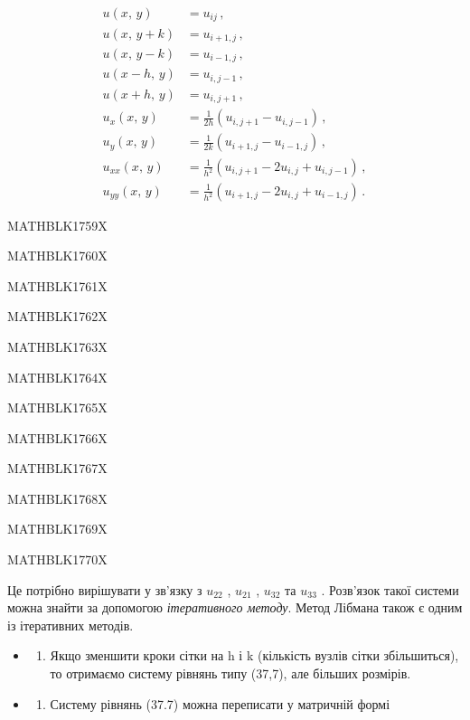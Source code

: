 \documentclass[
  ukrainian,
]{article}
\providecommand{\tightlist}{%
  \setlength{\itemsep}{0pt}\setlength{\parskip}{0pt}}
\begin{document}
\[
\begin{split} u\left(x,\,y\right) &= u_{ij}\,,\\ u\left(x,\,y+k\right) &= u_{i+1,j}\,,\\ u\left(x,\,y-k\right) &= u_{i-1,j}\,,\\ u\left(x-h,\,y\right) &= u_{i,j-1}\,,\\ u\left(x+h,\,y\right) &= u_{i,j+1}\,,\\ u_{x}\left(x,\,y\right) &= \frac{1}{2h}\left(u_{i,j+1}-u_{i,j-1}\right)\,,\\ u_{y}\left(x,\,y\right) &= \frac{1}{2k}\left(u_{i+1,j}-u_{i-1,j}\right)\,,\\ u_{xx}\left(x,\,y\right) &= \frac{1}{h^{2}}\left(u_{i,j+1}-2u_{i,j}+u_{i,j-1}\right)\,,\\ u_{yy}\left(x,\,y\right) &= \frac{1}{h^{2}}\left(u_{i+1,j}-2u_{i,j}+u_{i-1,j}\right)\,. \end{split}
\]

MATHBLK1759X

MATHBLK1760X

MATHBLK1761X

MATHBLK1762X

MATHBLK1763X

MATHBLK1764X

MATHBLK1765X

MATHBLK1766X

MATHBLK1767X

MATHBLK1768X

MATHBLK1769X

MATHBLK1770X

Це потрібно вирішувати у зв'язку з \(u_{22}\) , \(u_{21}\) , \(u_{32}\)
та \(u_{33}\) . Розв'язок такої системи можна знайти за допомогою
\emph{ітеративного методу}. Метод Лібмана також є одним із ітеративних
методів.

\begin{itemize}
\tightlist
\item
  \begin{enumerate}
  \def\labelenumi{\arabic{enumi}.}
  \setcounter{enumi}{1}
  \tightlist
  \item
    Якщо зменшити кроки сітки на h і k (кількість вузлів сітки
    збільшиться), то отримаємо систему рівнянь типу (37,7), але більших
    розмірів.
  \end{enumerate}
\item
  \begin{enumerate}
  \def\labelenumi{\arabic{enumi}.}
  \setcounter{enumi}{2}
  \tightlist
  \item
    Систему рівнянь (37.7) можна переписати у матричній формі
  \end{enumerate}
\end{itemize}
\end{document}
